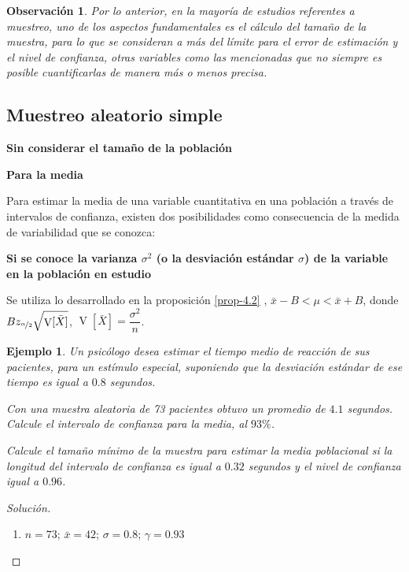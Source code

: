 \documentclass[a5paper,doc,10pt,noapacite]{apa6}
\DeclareMathOperator{\Var}{V}
\newtheorem{observ}{Observación}
\newtheorem{ejem}{Ejemplo}
\newcommand{\neodefi}[1]{%
	\vspace{1\baselineskip}
	\textbf{\small#1} \newline
}
\begin{document}
{{\begin{observ}
Por lo anterior, en la mayoría de estudios referentes a muestreo, uno de los aspectos fundamentales es el cálculo del tamaño de la muestra, para lo que se consideran a más del límite para el error de estimación y el nivel de confianza, otras variables como las mencionadas que no siempre es posible cuantificarlas
de manera más o menos precisa.
\end{observ}



%
\subsection{Muestreo aleatorio simple}

\neodefi{Sin considerar el tamaño de la población}

\neodefi{Para la media} 

Para estimar la media de una variable cuantitativa en una población a través de intervalos de confianza, existen dos posibilidades como consecuencia de la medida de variabilidad que se conozca:

\vspace{0.75\baselineskip}
	\textbf{Si se conoce la varianza \(\sigma^2\) (o la desviación estándar \(\sigma\)) de la variable en la población en estudio}\newline


Se utiliza lo desarrollado en la proposición \eqref{prop-4.2} \(\), \(\bar{x}-B<\mu<\bar{x}+B\), donde \(Bz_{\nicefrac{\alpha}{2}} 	\sqrt{\Var[\bar{X}]}\), \(\Var[\bar{X}]=\dfrac{\sigma^2}{n}\).

\begin{ejem}
	Un psicólogo desea estimar el tiempo medio de reacción de sus pacientes, para un estímulo especial, suponiendo que la desviación estándar de ese tiempo es igual a \(0.8\) segundos.
	\begin{APAenumerate}
		\item Con una muestra aleatoria de 73 pacientes obtuvo un promedio de \(4.1\) segundos. Calcule el intervalo de confianza para la media, al \(93\%\).
		\item Calcule el tamaño mínimo de la muestra para estimar la media poblacional si la longitud del intervalo de confianza es igual a \(0.32\) segundos y el nivel de confianza igual a \(0.96\).
	\end{APAenumerate}
\end{ejem}

\begin{proof}[Solución]\quad
	\begin{enumerate}
		\item \(n=73\); \(\bar{x}=42\); \(\sigma=0.8\); \(\gamma=0.93\)
		

\end{enumerate}
\end{proof}}}
\end{document}

